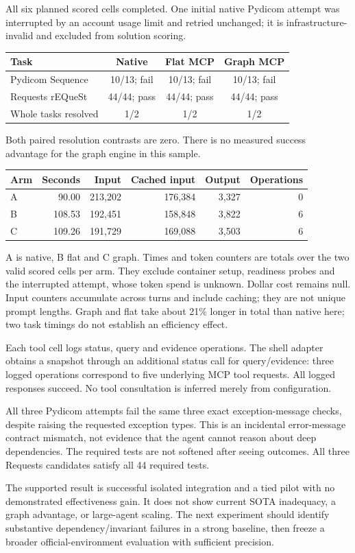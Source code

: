 All six planned scored cells completed. One initial native Pydicom attempt was interrupted by an account usage limit and retried unchanged; it is infrastructure-invalid and excluded from solution scoring.
\begin{center}\begin{tabular}{lccc}\toprule
Task & Native & Flat MCP & Graph MCP\\\midrule
Pydicom Sequence & 10/13; fail & 10/13; fail & 10/13; fail\\
Requests rEQueSt & 44/44; pass & 44/44; pass & 44/44; pass\\
Whole tasks resolved & 1/2 & 1/2 & 1/2\\\bottomrule
\end{tabular}\end{center}
Both paired resolution contrasts are zero. There is no measured success advantage for the graph engine in this sample.
\begin{center}\small\begin{tabular}{lrrrrr}\toprule
Arm & Seconds & Input & Cached input & Output & Operations\\\midrule
A & 90.00 & 213,202 & 176,384 & 3,327 & 0 \\
B & 108.53 & 192,451 & 158,848 & 3,822 & 6 \\
C & 109.26 & 191,729 & 169,088 & 3,503 & 6 \\
\bottomrule\end{tabular}\end{center}
A is native, B flat and C graph. Times and token counters are totals over the two valid scored cells per arm. They exclude container setup, readiness probes and the interrupted attempt, whose token spend is unknown. Dollar cost remains null. Input counters accumulate across turns and include caching; they are not unique prompt lengths. Graph and flat take about 21\% longer in total than native here; two task timings do not establish an efficiency effect.

Each tool cell logs status, query and evidence operations. The shell adapter obtains a snapshot through an additional status call for query/evidence: three logged operations correspond to five underlying MCP tool requests. All logged responses succeed. No tool consultation is inferred merely from configuration.

All three Pydicom attempts fail the same three exact exception-message checks, despite raising the requested exception types. This is an incidental error-message contract mismatch, not evidence that the agent cannot reason about deep dependencies. The required tests are not softened after seeing outcomes. All three Requests candidates satisfy all 44 required tests.

The supported result is successful isolated integration and a tied pilot with no demonstrated effectiveness gain. It does not show current SOTA inadequacy, a graph advantage, or large-agent scaling. The next experiment should identify substantive dependency/invariant failures in a strong baseline, then freeze a broader official-environment evaluation with sufficient precision.
